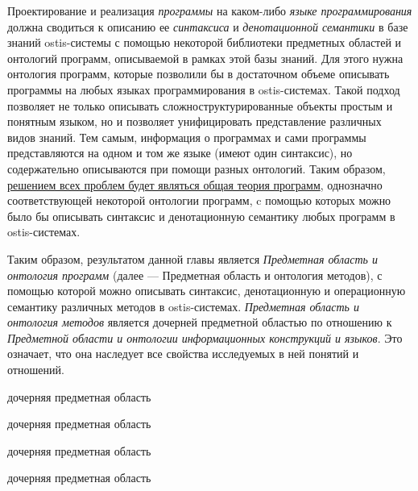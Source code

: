 Проектирование и реализация \textit{программы} на каком-либо \textit{языке программирования} должна сводиться к описанию ее \textit{синтаксиса} и \textit{денотационной семантики} в базе знаний ostis-системы с помощью некоторой библиотеки предметных областей и онтологий программ, описываемой в рамках этой базы знаний. Для этого нужна онтология программ, которые позволили бы в достаточном объеме описывать программы на любых языках программирования в ostis-системах. Такой подход позволяет не только описывать сложноструктурированные объекты простым и понятным языком, но и позволяет унифицировать представление различных видов знаний. Тем самым, информация о программах и сами программы представляются на одном и том же языке (имеют один синтаксис), но содержательно описываются при помощи разных онтологий. Таким образом, \uline{решением всех проблем будет являться общая теория программ}, однозначно соответствующей некоторой онтологии программ, c помощью которых можно было бы описывать синтаксис и денотационную семантику любых программ в ostis-системах.

Таким образом, результатом данной главы является \textit{Предметная область и онтология программ} (далее --- Предметная область и онтология методов), с помощью которой можно описывать синтаксис, денотационную и операционную семантику различных методов в ostis-системах. \textit{Предметная область и онтология методов} является дочерней предметной областью по отношению к \textit{Предметной области и онтологии информационных конструкций и языков}. Это означает, что она наследует все свойства исследуемых в ней понятий и отношений.

\begin{SCn}
\begin{scnrelfromlist}{дочерняя предметная область}
    \begin{scnindent}
        \begin{scnrelfromlist}{дочерняя предметная область}
        \end{scnrelfromlist}
    \end{scnindent}
\end{scnrelfromlist}
\end{SCn}

\begin{SCn}
\begin{scnrelfromlist}{дочерняя предметная область}
    \begin{scnindent}
        \begin{scnrelfromlist}{дочерняя предметная область}
        \end{scnrelfromlist}
    \end{scnindent}
\end{scnrelfromlist}
\end{SCn}

